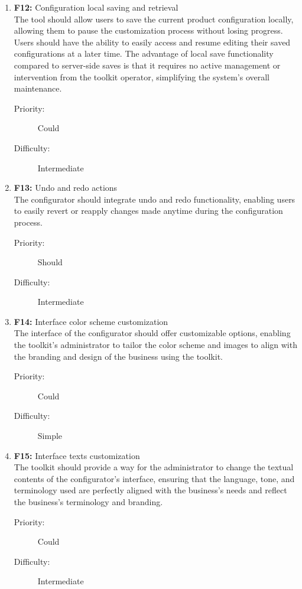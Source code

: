 \begin{enumerate}
\item \textbf{F12:} Configuration local saving and retrieval
\vspace{2pt}
\\The tool should allow users to save the current product configuration locally, allowing them to pause the customization process without losing progress. Users should have the ability to easily access and resume editing their saved configurations at a later time. The advantage of local save functionality compared to server-side saves is that it requires no active management or intervention from the toolkit operator, simplifying the system's overall maintenance.
\begin{description}
    \item[Priority:] Could
    \item[Difficulty:] Intermediate
\end{description}
\vspace{4pt}

\item \textbf{F13:} Undo and redo actions
\vspace{2pt}
\\The configurator should integrate undo and redo functionality, enabling users to easily revert or reapply changes made anytime during the configuration process.
\begin{description}
    \item[Priority:] Should
    \item[Difficulty:] Intermediate
\end{description}
\vspace{4pt}

\item \textbf{F14:} Interface color scheme customization
\vspace{2pt}
\\The interface of the configurator should offer customizable options, enabling the toolkit's administrator to tailor the color scheme and images to align with the branding and design of the business using the toolkit.
\begin{description}
    \item[Priority:] Could
    \item[Difficulty:] Simple
\end{description}
\vspace{4pt}

\item \textbf{F15:} \label{itm:F15} Interface texts customization
\vspace{2pt}
\\The toolkit should provide a way for the administrator to change the textual contents of the configurator's interface, ensuring that the language, tone, and terminology used are perfectly aligned with the business's needs and reflect the business's terminology and branding.
\begin{description}
    \item[Priority:] Could
    \item[Difficulty:] Intermediate
\end{description}
\vspace{4pt}


\end{enumerate}
